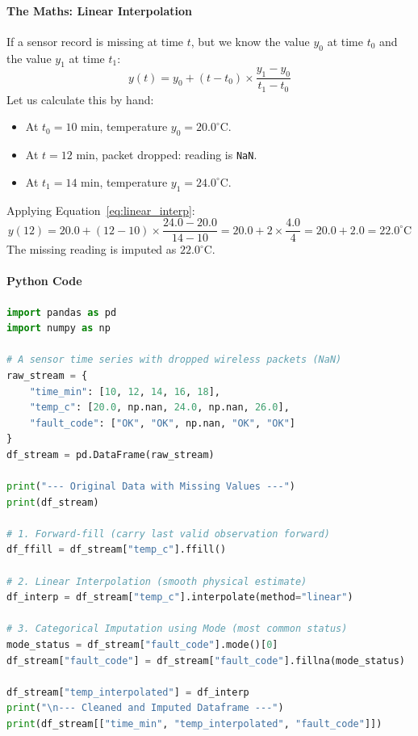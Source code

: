 \paragraph{The Maths: Linear Interpolation}
If a sensor record is missing at time $t$, but we know the value $y_0$ at time $t_0$ and the value $y_1$ at time $t_1$:
\begin{equation}
y(t) = y_0 + (t - t_0) \times \frac{y_1 - y_0}{t_1 - t_0}\label{eq:linear_interp}
\end{equation}
Let us calculate this by hand:
\begin{itemize}
    \item At $t_0 = 10\text{ min}$, temperature $y_0 = 20.0^\circ\text{C}$.
    \item At $t = 12\text{ min}$, packet dropped: reading is \texttt{NaN}.
    \item At $t_1 = 14\text{ min}$, temperature $y_1 = 24.0^\circ\text{C}$.
\end{itemize}
Applying Equation~\ref{eq:linear_interp}:
\begin{equation*}
y(12) = 20.0 + (12 - 10) \times \frac{24.0 - 20.0}{14 - 10} = 20.0 + 2 \times \frac{4.0}{4} = 20.0 + 2.0 = 22.0^\circ\text{C}
\end{equation*}
The missing reading is imputed as $22.0^\circ\text{C}$.

\paragraph{Python Code}
\begin{lstlisting}[language=Python]
import pandas as pd
import numpy as np

# A sensor time series with dropped wireless packets (NaN)
raw_stream = {
    "time_min": [10, 12, 14, 16, 18],
    "temp_c": [20.0, np.nan, 24.0, np.nan, 26.0],
    "fault_code": ["OK", "OK", np.nan, "OK", "OK"]
}
df_stream = pd.DataFrame(raw_stream)

print("--- Original Data with Missing Values ---")
print(df_stream)

# 1. Forward-fill (carry last valid observation forward)
df_ffill = df_stream["temp_c"].ffill()

# 2. Linear Interpolation (smooth physical estimate)
df_interp = df_stream["temp_c"].interpolate(method="linear")

# 3. Categorical Imputation using Mode (most common status)
mode_status = df_stream["fault_code"].mode()[0]
df_stream["fault_code"] = df_stream["fault_code"].fillna(mode_status)

df_stream["temp_interpolated"] = df_interp
print("\n--- Cleaned and Imputed Dataframe ---")
print(df_stream[["time_min", "temp_interpolated", "fault_code"]])
\end{lstlisting}

